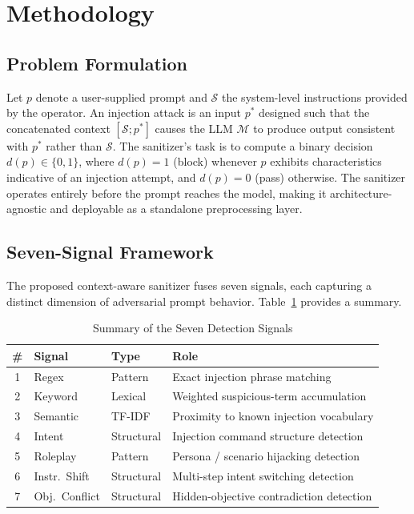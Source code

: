 \documentclass[10pt,conference]{IEEEtran}
\begin{document}
\section{Methodology}
\label{sec:method}

\subsection{Problem Formulation}

Let $p$ denote a user-supplied prompt and $\mathcal{S}$ the
system-level instructions provided by the operator.
An injection attack is an input $p^*$ designed such that the
concatenated context $[\mathcal{S}; p^*]$ causes the LLM
$\mathcal{M}$ to produce output consistent with $p^*$ rather than
$\mathcal{S}$.
The sanitizer's task is to compute a binary decision
$d(p) \in \{0, 1\}$, where $d(p) = 1$ (block) whenever $p$
exhibits characteristics indicative of an injection attempt,
and $d(p) = 0$ (pass) otherwise.
The sanitizer operates entirely before the prompt reaches the model,
making it architecture-agnostic and deployable as a standalone
preprocessing layer.

\subsection{Seven-Signal Framework}

The proposed context-aware sanitizer fuses seven signals, each
capturing a distinct dimension of adversarial prompt behavior.
Table~\ref{tab:signals} provides a summary.

\begin{table}[t]
\caption{Summary of the Seven Detection Signals}
\label{tab:signals}
\centering
\small
\begin{tabular}{clll}
\toprule
\# & Signal & Type & Role \\
\midrule
1 & Regex & Pattern & Exact injection phrase matching \\
2 & Keyword & Lexical & Weighted suspicious-term accumulation \\
3 & Semantic & TF-IDF & Proximity to known injection vocabulary \\
4 & Intent & Structural & Injection command structure detection \\
5 & Roleplay & Pattern & Persona / scenario hijacking detection \\
6 & Instr.\ Shift & Structural & Multi-step intent switching detection \\
7 & Obj.\ Conflict & Structural & Hidden-objective contradiction detection \\
\bottomrule
\end{tabular}
\end{table}
\end{document}

